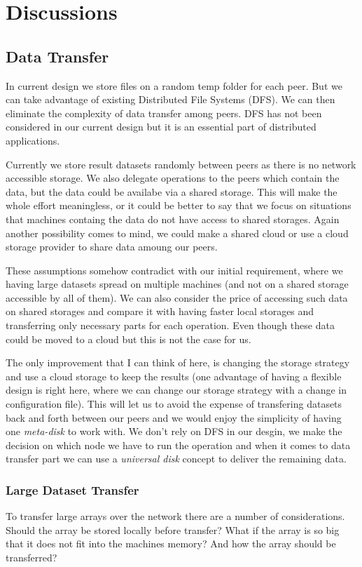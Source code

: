 \chapter{Discussions}
\label{cha:discussions}

\section{Data Transfer}
In current design we store files on a random temp folder for each peer.
But we can take advantage of existing Distributed File Systems (DFS).
We can then eliminate the complexity of data transfer among peers. 
DFS has not been considered in our current design but it is an essential part of 
distributed applications.

Currently we store result datasets randomly between peers as there is no
network accessible storage.
We also delegate operations to the peers which contain the data, 
but the data could be availabe via a shared storage.
This will make the whole effort meaningless, 
or it could be better to say that we focus on situations that
machines containg the data do not have access to shared storages.
Again another possibility comes to mind, 
we could make a shared cloud or use a cloud storage provider to 
share data amoung our peers.

These assumptions somehow contradict with our initial requirement,
where we having large datasets spread on multiple machines (and not on a shared storage accessible by all of them). 
We can also consider the price of accessing such data on shared storages and
compare it with having faster local storages and transferring only necessary parts for each operation.
Even though these data could be moved to a cloud but this is not the case for us.

The only improvement that I can think of here, 
is changing the storage strategy and use a cloud storage to keep the results
(one advantage of having a flexible design is right here, 
where we can change our storage strategy with a change in configuration file).
This will let us to avoid the expense of transfering datasets back and forth
between our peers and we would enjoy the simplicity of having one \textit{meta-disk}
to work with. 
We don't rely on DFS in our desgin, we make the decision 
on which node we have to run the operation and when it comes to 
data transfer part we can use a \textit{universal disk} concept to deliver the
remaining data.

\subsection{Large Dataset Transfer}
To transfer large arrays over the network there are a number of considerations. 
Should the array be stored locally before transfer?
What if the array is so big that it does not fit into the machines memory? 
And how the array should be transferred?

